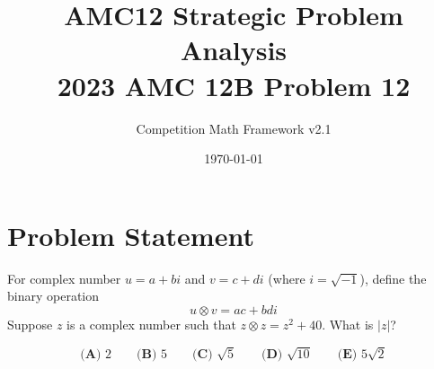 \documentclass[12pt]{article}
\begin{document}
\title{AMC12 Strategic Problem Analysis\\2023 AMC 12B Problem 12}
\author{Competition Math Framework v2.1}
\date{\today}
\maketitle

\section*{Problem Statement}

For complex number $u = a+bi$ and $v = c+di$ (where $i=\sqrt{-1}$), define the binary operation
$$u \otimes v = ac + bdi$$
Suppose $z$ is a complex number such that $z\otimes z = z^{2}+40$. What is $|z|$?

$$\textbf{(A) }2\qquad\textbf{(B) }5\qquad\textbf{(C) }\sqrt{5}\qquad\textbf{(D) }\sqrt{10}\qquad\textbf{(E) }5\sqrt{2}$$
\end{document}
